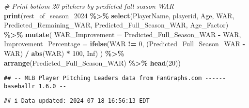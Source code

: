 \documentclass[
]{article}
\newenvironment{Shaded}{\begin{snugshade}}{\end{snugshade}}
\newcommand{\AttributeTok}[1]{\textcolor[rgb]{0.13,0.29,0.53}{#1}}
\newcommand{\CommentTok}[1]{\textcolor[rgb]{0.56,0.35,0.01}{\textit{#1}}}
\newcommand{\ConstantTok}[1]{\textcolor[rgb]{0.56,0.35,0.01}{#1}}
\newcommand{\DecValTok}[1]{\textcolor[rgb]{0.00,0.00,0.81}{#1}}
\newcommand{\FunctionTok}[1]{\textcolor[rgb]{0.13,0.29,0.53}{\textbf{#1}}}
\newcommand{\NormalTok}[1]{#1}
\newcommand{\SpecialCharTok}[1]{\textcolor[rgb]{0.81,0.36,0.00}{\textbf{#1}}}
\begin{document}
\begin{Shaded}
\begin{Highlighting}[]
\CommentTok{\# Print bottom 20 pitchers by predicted full season WAR}
\FunctionTok{print}\NormalTok{(rest\_of\_season\_2024 }\SpecialCharTok{\%\textgreater{}\%} 
        \FunctionTok{select}\NormalTok{(PlayerName, playerid, Age, WAR, Predicted\_Remaining\_WAR, Predicted\_Full\_Season\_WAR, Age\_Factor) }\SpecialCharTok{\%\textgreater{}\%} 
        \FunctionTok{mutate}\NormalTok{(}
          \AttributeTok{WAR\_Improvement =}\NormalTok{ Predicted\_Full\_Season\_WAR }\SpecialCharTok{{-}}\NormalTok{ WAR,}
          \AttributeTok{Improvement\_Percentage =} \FunctionTok{ifelse}\NormalTok{(WAR }\SpecialCharTok{!=} \DecValTok{0}\NormalTok{, (Predicted\_Full\_Season\_WAR }\SpecialCharTok{{-}}\NormalTok{ WAR) }\SpecialCharTok{/} \FunctionTok{abs}\NormalTok{(WAR) }\SpecialCharTok{*} \DecValTok{100}\NormalTok{, }\ConstantTok{Inf}\NormalTok{)}
\NormalTok{        ) }\SpecialCharTok{\%\textgreater{}\%}
        \FunctionTok{arrange}\NormalTok{(Predicted\_Full\_Season\_WAR) }\SpecialCharTok{\%\textgreater{}\%}
        \FunctionTok{head}\NormalTok{(}\DecValTok{20}\NormalTok{))}
\end{Highlighting}
\end{Shaded}

\begin{verbatim}
## -- MLB Player Pitching Leaders data from FanGraphs.com ------ baseballr 1.6.0 --
\end{verbatim}

\begin{verbatim}
## i Data updated: 2024-07-18 16:56:13 EDT
\end{verbatim}
\end{document}

